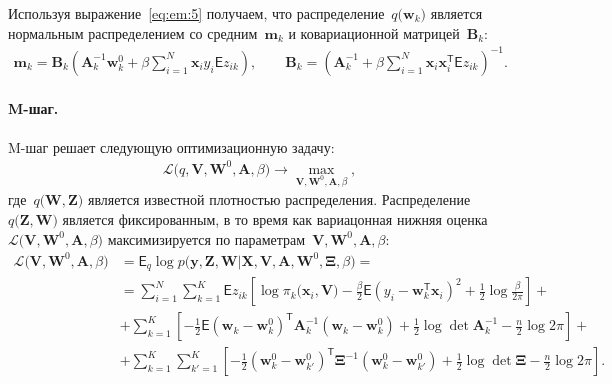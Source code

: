 \documentclass[12pt, twoside]{article}
\numberwithin{equation}{section}
\begin{document}
Используя выражение~\eqref{eq:em:5} получаем, что  распределение~$q\bigr(\mathbf{w}_{k}\bigr)$ является нормальным распределением со средним~$\mathbf{m}_{k}$ и ковариационной матрицей~$\mathbf{B}_k$:
\[
\label{eq:em:6}
\begin{aligned}
\mathbf{m}_{k} = \mathbf{B}_{k}\left(\mathbf{A}_{k}^{-1}\mathbf{w}_{k}^{0}+\beta\sum_{i=1}^{N}\mathbf{x}_{i}y_{i}\mathsf{E}z_{ik}\right), \qquad \mathbf{B}_{k} = \left(\mathbf{A}_{k}^{-1}+\beta\sum_{i=1}^{N}\mathbf{x}_{i}\mathbf{x}_{i}^{\mathsf{T}}\mathsf{E}z_{ik}\right)^{-1}.
\end{aligned}
\]

\paragraph{M-шаг.} M-шаг решает следующую оптимизационную задачу:
\[
\label{eq:em:new:3}
\begin{aligned}
\mathcal{L}\bigr(q, \textbf{V}, \textbf{W}^{0}, \textbf{A}, \beta\bigr) \to \max_{\textbf{V}, \textbf{W}^{0}, \textbf{A}, \beta},
\end{aligned}
\]
где~$q\bigr(\textbf{W}, \textbf{Z}\bigr)$ является известной плотностью распределения.
Распределение~$q\bigr(\mathbf{Z}, \mathbf{W}\bigr)$ является фиксированным, в то время как вариацонная нижняя оценка~$\mathcal{L}\bigr(\textbf{V}, \textbf{W}^{0}, \textbf{A}, \beta\bigr)$ максимизируется по параметрам~$\mathbf{V}, \mathbf{W}^0, \textbf{A},  \beta$:
\[
\label{eq:em:7}
\begin{aligned}
\mathcal{L}\bigr(\textbf{V}, \textbf{W}^{0}, \textbf{A}, \beta\bigr) &= \mathsf{E}_{q}\log p\bigr(\mathbf{y}, \mathbf{Z}, \mathbf{W}|\mathbf{X}, \mathbf{V}, \textbf{A}, \textbf{W}^{0}, \bm{\Xi}, \beta\bigr) =  \\
&= \sum_{i=1}^{N}\sum_{k=1}^{K}\mathsf{E}z_{ik}\left[\log\pi_k\bigr(\textbf{x}_i, \textbf{V}\bigr) - \frac{\beta}{2}\mathsf{E}\left(y_{i} - \textbf{w}_{k}^{\mathsf{T}}\textbf{x}_{i}\right)^{2} + \frac{1}{2}\log\frac{\beta}{2\pi}\right] +\\
&+ \sum_{k=1}^{K}\left[-\frac{1}{2}\mathsf{E}\left(\textbf{w}_{k} - \textbf{w}_{k}^{0}\right)^{\mathsf{T}}\textbf{A}_{k}^{-1}\left(\textbf{w}_{k} - \textbf{w}_{k}^{0}\right) + \frac{1}{2}\log\det\textbf{A}^{-1}_{k} - \frac{n}{2}\log2\pi\right] +\\
&+ \sum_{k=1}^{K}\sum_{k'=1}^{K}\left[-\frac{1}{2}\left(\textbf{w}_{k}^{0}-\textbf{w}_{k'}^{0}\right)^{\mathsf{T}}\bm{\Xi}^{-1}\left(\textbf{w}_{k}^{0}-\textbf{w}_{k'}^{0}\right) +\frac{1}{2}\log\det\bm{\Xi} -\frac{n}{2}\log{2\pi}\right].
\end{aligned}
\]
\end{document}
